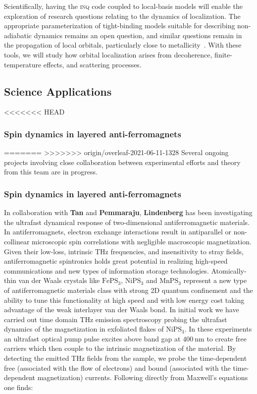 Scientifically, having the \textsc{inq} code coupled to local-basis models will enable the exploration of research questions relating to the dynamics of localization. 
The appropriate parameterization of tight-binding models suitable for describing non-adiabatic dynamics remains an open question, and similar questions remain in the propagation of local orbitals, particularly close to metallicity~\cite{Yost2019}. 
With these tools, we will study how orbital localization arises from decoherence, finite-temperature effects, and scattering processes.  

\subsection{Science Applications}
<<<<<<< HEAD

\subsubsection{Spin dynamics in layered anti-ferromagnets}

=======
>>>>>>> origin/overleaf-2021-06-11-1328
Several ongoing projects involving close collaboration between experimental efforts and theory from this team are in progress.

\subsubsection{Spin dynamics in layered anti-ferromagnets}

In collaboration with {\bf Tan} and {\bf Pemmaraju}, {\bf Lindenberg} has been investigating the ultrafast dynamical response of two-dimensional antiferromagnetic materials.
In antiferromagnets, electron exchange interactions result in antiparallel or non-collinear microscopic spin correlations with negligible macroscopic magnetization.
Given their low-loss, intrinsic THz frequencies, and insensitivity to stray fields, antiferromagnetic spintronics holds great potential in realizing high-speed communications and new types of information storage technologies. 
Atomically-thin van der Waals crystals like \(\mathrm{FePS_3}\), \(\mathrm{NiPS_3}\) and \(\mathrm{MnPS_3}\) represent a new type of antiferromagnetic materials class with strong 2D quantum confinement and the ability to tune this functionality at high speed and with low energy cost taking advantage of the weak interlayer van der Waals bond.
In initial work we have carried out time domain THz emission spectroscopy probing the ultrafast dynamics of the magnetization in exfoliated flakes of \(\mathrm{NiPS_3}\).
In these experiments an ultrafast optical pump pulse excites above band gap at \(400~\mathrm{nm}\) to create free carriers which then couple to the intrinsic magnetization of the material.
By detecting the emitted THz fields from the sample, we probe the time-dependent free (associated with the flow of electrons) and bound (associated with the time-dependent magnetization) currents.
Following directly from Maxwell’s equations one finds: 

